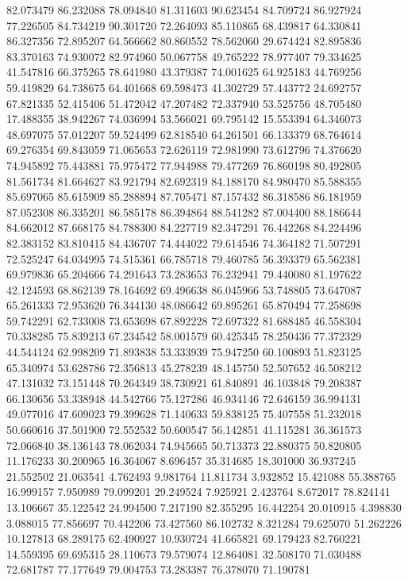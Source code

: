 82.073479
86.232088
78.094840
81.311603
90.623454
84.709724
86.927924
77.226505
84.734219
90.301720
72.264093
85.110865
68.439817
64.330841
86.327356
72.895207
64.566662
80.860552
78.562060
29.674424
82.895836
83.370163
74.930072
82.974960
50.067758
49.765222
78.977407
79.334625
41.547816
66.375265
78.641980
43.379387
74.001625
64.925183
44.769256
59.419829
64.738675
64.401668
69.598473
41.302729
57.443772
24.692757
67.821335
52.415406
51.472042
47.207482
72.337940
53.525756
48.705480
17.488355
38.942267
74.036994
53.566021
69.795142
15.553394
64.346073
48.697075
57.012207
59.524499
62.818540
64.261501
66.133379
68.764614
69.276354
69.843059
71.065653
72.626119
72.981990
73.612796
74.376620
74.945892
75.443881
75.975472
77.944988
79.477269
76.860198
80.492805
81.561734
81.664627
83.921794
82.692319
84.188170
84.980470
85.588355
85.697065
85.615909
85.288894
87.705471
87.157432
86.318586
86.181959
87.052308
86.335201
86.585178
86.394864
88.541282
87.004400
88.186644
84.662012
87.668175
84.788300
84.227719
82.347291
76.442268
84.224496
82.383152
83.810415
84.436707
74.444022
79.614546
74.364182
71.507291
72.525247
64.034995
74.515361
66.785718
79.460785
56.393379
65.562381
69.979836
65.204666
74.291643
73.283653
76.232941
79.440080
81.197622
42.124593
68.862139
78.164692
69.496638
86.045966
53.748805
73.647087
65.261333
72.953620
76.344130
48.086642
69.895261
65.870494
77.258698
59.742291
62.733008
73.653698
67.892228
72.697322
81.688485
46.558304
70.338285
75.839213
67.234542
58.001579
60.425345
78.250436
77.372329
44.544124
62.998209
71.893838
53.333939
75.947250
60.100893
51.823125
65.340974
53.628786
72.356813
45.278239
48.145750
52.507652
46.508212
47.131032
73.151448
70.264349
38.730921
61.840891
46.103848
79.208387
66.130656
53.338948
44.542766
75.127286
46.934146
72.646159
36.994131
49.077016
47.609023
79.399628
71.140633
59.838125
75.407558
51.232018
50.660616
37.501900
72.552532
50.600547
56.142851
41.115281
36.361573
72.066840
38.136143
78.062034
74.945665
50.713373
22.880375
50.820805
11.176233
30.200965
16.364067
8.696457
35.314685
18.301000
36.937245
21.552502
21.063541
4.762493
9.981764
11.811734
3.932852
15.421088
55.388765
16.999157
7.950989
79.099201
29.249524
7.925921
2.423764
8.672017
78.824141
13.106667
35.122542
24.994500
7.217190
82.355295
16.442254
20.010915
4.398830
3.088015
77.856697
70.442206
73.427560
86.102732
8.321284
79.625070
51.262226
10.127813
68.289175
62.490927
10.930724
41.665821
69.179423
82.760221
14.559395
69.695315
28.110673
79.579074
12.864081
32.508170
71.030488
72.681787
77.177649
79.004753
73.283387
76.378070
71.190781
